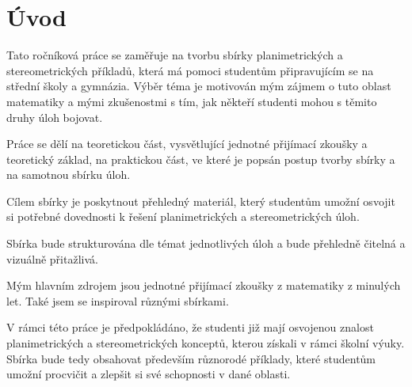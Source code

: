 \chapter*{Úvod}

Tato ročníková práce se zaměřuje na tvorbu sbírky planimetrických a stereometrických příkladů, která má pomoci studentům připravujícím se na střední školy a gymnázia. Výběr téma je motivován mým zájmem o tuto oblast matematiky a mými zkušenostmi s tím, jak někteří studenti mohou s těmito druhy úloh bojovat.

Práce se dělí na teoretickou část, vysvětlující jednotné přijímací zkoušky a teoretický základ, na praktickou část, ve které je popsán postup tvorby sbírky a na samotnou sbírku úloh.

Cílem sbírky je poskytnout přehledný materiál, který studentům umožní osvojit si potřebné dovednosti k řešení planimetrických a stereometrických úloh.

Sbírka bude strukturována dle témat jednotlivých úloh a bude přehledně čitelná a vizuálně přitažlivá.

Mým hlavním zdrojem jsou jednotné přijímací zkoušky z matematiky z minulých let. Také jsem se inspiroval různými sbírkami.

V rámci této práce je předpokládáno, že studenti již mají osvojenou znalost planimetrických a stereometrických konceptů, kterou získali v rámci školní výuky. Sbírka bude tedy obsahovat především různorodé příklady, které studentům umožní procvičit a zlepšit si své schopnosti v dané oblasti.
